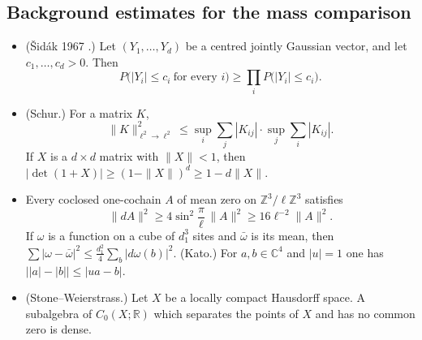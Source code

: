 \documentclass[11pt]{amsart}
\theoremstyle{definition}
\begin{document}
\subsection{Background estimates for the mass comparison}
\begin{itemize}
\item[(K22)] (\v{S}id\'ak 1967 \cite{Sidak1967}.)
Let $(Y_1,\dots,Y_d)$ be a centred jointly Gaussian vector, and let $c_1,\dots,c_d>0$.
Then
\begin{equation*}
P\bigl(|Y_i|\le c_i\ \text{for every }i\bigr)\ge\prod_iP\bigl(|Y_i|\le c_i\bigr).
\end{equation*}
\item[(K23)] (Schur.)
For a matrix $K$,
\begin{equation*}
\|K\|^2_{\ell^2\to\ell^2}\le\sup_i\sum_j|K_{ij}|\cdot\sup_j\sum_i|K_{ij}|.
\end{equation*}
If $X$ is a $d\times d$ matrix with $\|X\|<1$, then $|\det(1+X)|\ge(1-\|X\|)^d\ge1-d\|X\|$.
\item[(K24)] Every coclosed one-cochain $A$ of mean zero on $\mathbb Z^3/\ell\mathbb Z^3$ satisfies
\begin{equation*}
\|dA\|^2\ge4\sin^2\frac\pi\ell\,\|A\|^2\ge16\ell^{-2}\|A\|^2.
\end{equation*}
If $\omega$ is a function on a cube of $d_1^3$ sites and $\bar\omega$ is its mean, then $\sum|\omega-\bar\omega|^2\le\frac{d_1^2}4\sum_b|d\omega(b)|^2$.
(Kato.) For $a,b\in\mathbb C^4$ and $|u|=1$ one has $\bigl||a|-|b|\bigr|\le|ua-b|$.
\item[(K28)] (Stone--Weierstrass.) Let $X$ be a locally compact Hausdorff space.
A subalgebra of $C_0(X;\mathbb R)$ which separates the points of $X$ and has no common zero is dense.
\end{itemize}
\end{document}
